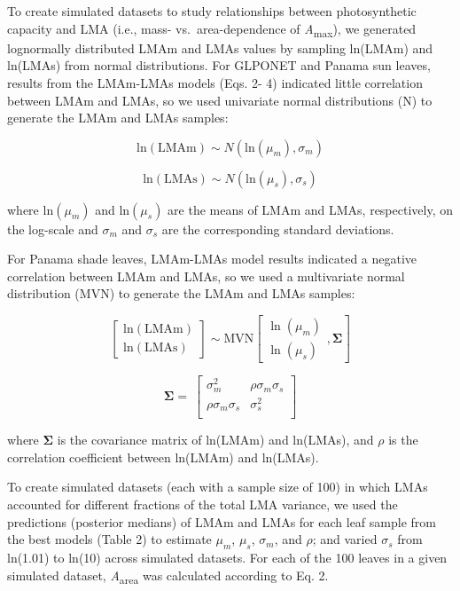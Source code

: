 \documentclass[
  12pt,
  letterpaper,
  DIV=11,
  numbers=noendperiod]{scrartcl}
\begin{document}
To create simulated datasets to study relationships between
photosynthetic capacity and LMA (i.e., mass- vs.~area-dependence of
\emph{A}\textsubscript{max}), we generated lognormally distributed LMAm
and LMAs values by sampling ln(LMAm) and ln(LMAs) from normal
distributions. For GLPONET and Panama sun leaves, results from the
LMAm-LMAs models (Eqs. 2- 4) indicated little correlation between LMAm
and LMAs, so we used univariate normal distributions (N) to generate the
LMAm and LMAs samples:

\[
\mathrm{ln}(\mathrm{LMAm}) \sim N(\mathrm{ln}(\mu_m), \sigma_m)
\]

\[
\mathrm{ln}(\mathrm{LMAs}) \sim N(\mathrm{ln}(\mu_s), \sigma_s)
\]

where \(\mathrm{ln}(\mu_m)\) and \(\mathrm{ln}(\mu_s)\) are the means of
LMAm and LMAs, respectively, on the log-scale and \(\sigma_m\) and
\(\sigma_s\) are the corresponding standard deviations.

For Panama shade leaves, LMAm-LMAs model results indicated a negative
correlation between LMAm and LMAs, so we used a multivariate normal
distribution (MVN) to generate the LMAm and LMAs samples:

\[
\begin{bmatrix}
\mathrm{ln}(\mathrm{LMAm})\\
\mathrm{ln}(\mathrm{LMAs})
\end{bmatrix}
\sim \mathrm{MVN}
\left[
\begin{matrix}
\ln(\mu_{m})\\
\ln(\mu_{s})
\end{matrix}
,\mathbf{\Sigma}
\right]
\]

\[
\mathbf{\Sigma} = \
\begin{bmatrix}
\sigma_m^2 & \rho \sigma_m \sigma_s \\
\rho \sigma_m \sigma_s & \sigma_s^2 \\
\end{bmatrix}
\]

where \(\boldsymbol{\Sigma}\) is the covariance matrix of ln(LMAm) and
ln(LMAs), and \(\rho\) is the correlation coefficient between ln(LMAm)
and ln(LMAs).

To create simulated datasets (each with a sample size of 100) in which
LMAs accounted for different fractions of the total LMA variance, we
used the predictions (posterior medians) of LMAm and LMAs for each leaf
sample from the best models (Table 2) to estimate \(\mu_m\), \(\mu_s\),
\(\sigma_m\), and \(\rho\); and varied \(\sigma_s\) from ln(1.01) to
ln(10) across simulated datasets. For each of the 100 leaves in a given
simulated dataset, \emph{A}\textsubscript{area} was calculated according
to Eq. 2.
\end{document}
